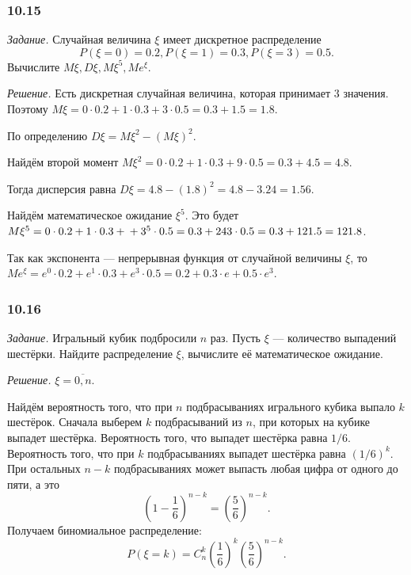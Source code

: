 \subsubsection*{10.15}

\textit{Задание.} Случайная величина $ \xi $ имеет дискретное распределение
$$P \left( \xi = 0 \right) = 0.2,
P \left( \xi = 1 \right) = 0.3,
P \left( \xi = 3 \right) = 0.5.$$
Вычислите $M \xi, D \xi, M \xi^5, Me^{ \xi }$.

\textit{Решение.} Есть дискретная случайная величина, которая принимает 3 значения.
Поэтому $M \xi = 0 \cdot 0.2 + 1 \cdot 0.3 + 3 \cdot 0.5 = 0.3 + 1.5 = 1.8$.

По определению $D \xi = M \xi^2 - \left( M \xi \right)^2$.

Найдём второй момент $M \xi^2 = 0 \cdot 0.2 + 1 \cdot 0.3 + 9 \cdot 0.5 = 0.3 + 4.5 = 4.8$.

Тогда дисперсия равна $D \xi = 4.8 - \left( 1.8 \right)^2 = 4.8 - 3.24 = 1.56$.

Найдём математическое ожидание $ \xi^5$.
Это будет $M \xi^5 = 0 \cdot 0.2 + 1 \cdot 0.3 + \\
+ 3^5 \cdot 0.5 = 0.3 + 243 \cdot 0.5 = 0.3 + 121.5 = 121.8$.

Так как экспонента --- непрерывная функция от случайной величины $ \xi $, то $Me^{ \xi } = e^0 \cdot 0.2 + e^1 \cdot 0.3 + e^3 \cdot 0.5 = 0.2 + 0.3 \cdot e + 0.5 \cdot e^3$.

\subsubsection*{10.16}

\textit{Задание.} Игральный кубик подбросили $n$ раз.
Пусть $ \xi $ --- количество выпадений шестёрки.
Найдите распределение $ \xi $, вычислите её математическое ожидание.

\textit{Решение.} $ \xi = \overline{0, n}$.

Найдём вероятность того, что при $n$ подбрасываниях игрального кубика выпало $k$ шестёрок.
Сначала выберем $k$ подбрасываний из $n$, при которых на кубике выпадет шестёрка.
Вероятность того, что выпадет шестёрка равна $1/6$.
Вероятность того, что при $k$ подбрасываниях выпадет шестёрка равна $ \left( 1/6 \right)^k$.
При остальных $n - k$ подбрасываниях может выпасть любая цифра от одного до пяти, а это
$$ \left( 1 - \frac{1}{6} \right)^{n-k} =
\left( \frac{5}{6} \right)^{n-k}.$$
Получаем биномиальное распределение:
$$P \left( \xi = k \right) =
C_n^k \left( \frac{1}{6} \right)^k \left( \frac{5}{6} \right)^{n-k}.$$

